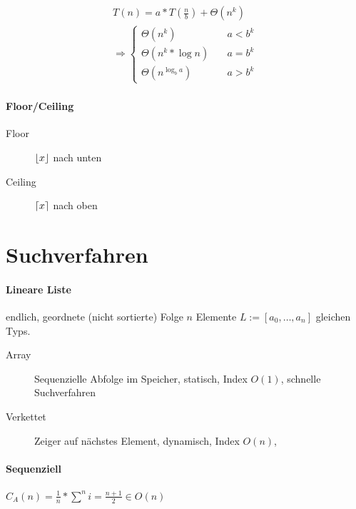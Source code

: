 \begin{gather*}
  T(n) = a * T( \frac{n}{b} ) + \Theta (n^k) \\
  \Rightarrow \begin{cases}
    \Theta ( n^k ) \quad          & a < b^k \\
    \Theta ( n^k * \log n ) \quad & a = b^k \\
    \Theta ( n^{\log_b a} ) \quad & a > b^k
  \end{cases}
\end{gather*}

\paragraph{Floor/Ceiling}

\begin{description}
  \item [Floor] $\lfloor x\rfloor$ nach unten
  \item [Ceiling] $\lceil x\rceil$ nach oben
\end{description}

\section{Suchverfahren}

\paragraph{Lineare Liste}
endlich, geordnete (nicht sortierte) Folge $n$ Elemente $L := [a_0, \dots, a_n]$ gleichen Typs.

\begin{description}
  \item [Array] Sequenzielle Abfolge im Speicher, statisch, Index $O(1)$, schnelle Suchverfahren
  \item [Verkettet] Zeiger auf nächstes Element, dynamisch, Index $O(n)$,
\end{description}

\paragraph{Sequenziell}
$C_A(n) = \frac{1}{n} * \sum^n i = \frac{n + 1}{2} \in O(n)$\

\begin{algorithm}[H]



\end{algorithm}

